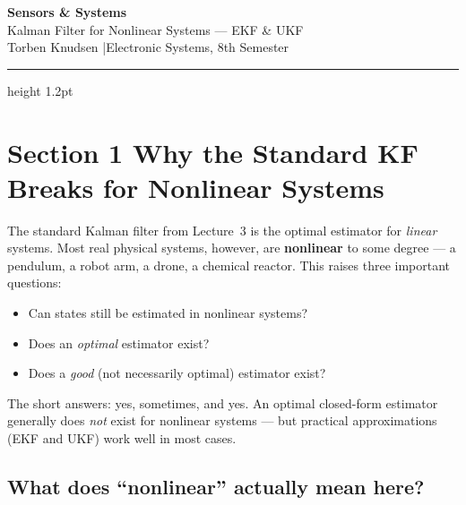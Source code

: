 \documentclass[12pt, a4paper]{article}
\begin{document}
\begin{center}
  {\LARGE\bfseries\color{headernavy} Sensors \& Systems}\\[4pt]
  {\large Kalman Filter for Nonlinear Systems --- EKF \& UKF}\\[2pt]
  {\normalsize Torben Knudsen \quad|\quad Electronic Systems, 8th Semester}
\end{center}

\vspace{4pt}\hrule height 1.2pt\vspace{12pt}

\section*{Section 1 \quad Why the Standard KF Breaks for Nonlinear Systems}

The standard Kalman filter from Lecture~3 is the optimal estimator
for \emph{linear} systems.
Most real physical systems, however, are \textbf{nonlinear} to some
degree --- a pendulum, a robot arm, a drone, a chemical reactor.
This raises three important questions:

\begin{itemize}[leftmargin=1.4em]
  \item Can states still be estimated in nonlinear systems?
  \item Does an \emph{optimal} estimator exist?
  \item Does a \emph{good} (not necessarily optimal) estimator exist?
\end{itemize}

The short answers: yes, sometimes, and yes.
An optimal closed-form estimator generally does \emph{not} exist for
nonlinear systems --- but practical approximations (EKF and UKF)
work well in most cases.

\subsection*{What does ``nonlinear'' actually mean here?}
\end{document}
